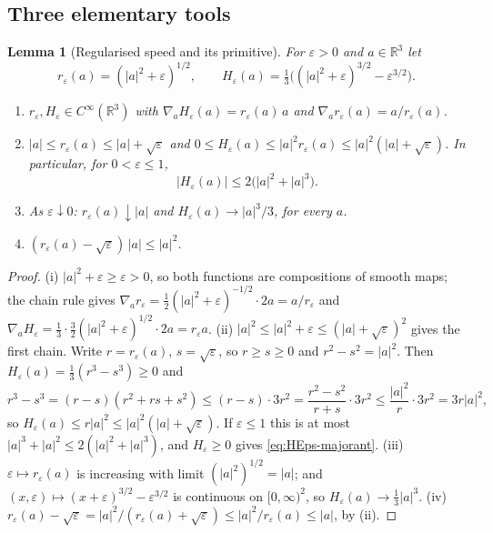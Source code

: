 \documentclass[11pt]{article}
\newtheorem{lemma}[theorem]{Lemma}
\theoremstyle{definition}
\theoremstyle{plain}
\newcommand{\R}{\mathbb R}
\begin{document}
\subsection*{Three elementary tools}

\begin{lemma}[Regularised speed and its primitive]\label{lem:reg-calculus}
For $\varepsilon>0$ and $a\in\R^3$ let
\[
 r_\varepsilon(a)=(|a|^2+\varepsilon)^{1/2},\qquad
 H_\varepsilon(a)=\tfrac13\bigl((|a|^2+\varepsilon)^{3/2}-\varepsilon^{3/2}\bigr).
\]
\begin{enumerate}
\item[(i)] $r_\varepsilon,H_\varepsilon\in C^\infty(\R^3)$ with
 $\nabla_aH_\varepsilon(a)=r_\varepsilon(a)\,a$ and
 $\nabla_ar_\varepsilon(a)=a/r_\varepsilon(a)$.
\item[(ii)] $|a|\leq r_\varepsilon(a)\leq|a|+\sqrt\varepsilon$ and
 $0\leq H_\varepsilon(a)\leq|a|^2r_\varepsilon(a)\leq|a|^2(|a|+\sqrt\varepsilon)$.
 In particular, for $0<\varepsilon\leq1$,
 \begin{equation}\label{eq:HEps-majorant}
  |H_\varepsilon(a)|\leq 2\bigl(|a|^2+|a|^3\bigr).
 \end{equation}
\item[(iii)] As $\varepsilon\downarrow0$: $r_\varepsilon(a)\downarrow|a|$ and
 $H_\varepsilon(a)\to|a|^3/3$, for every $a$.
\item[(iv)] $(r_\varepsilon(a)-\sqrt\varepsilon)\,|a|\leq|a|^2$.
\end{enumerate}
\end{lemma}

\begin{proof}
(i) $|a|^2+\varepsilon\geq\varepsilon>0$, so both functions are compositions
of smooth maps; the chain rule gives
$\nabla_ar_\varepsilon=\tfrac12(|a|^2+\varepsilon)^{-1/2}\cdot2a=a/r_\varepsilon$
and $\nabla_aH_\varepsilon=\tfrac13\cdot\tfrac32(|a|^2+\varepsilon)^{1/2}\cdot2a
=r_\varepsilon a$.
(ii) $|a|^2\leq|a|^2+\varepsilon\leq(|a|+\sqrt\varepsilon)^2$ gives the first
chain.  Write $r=r_\varepsilon(a)$, $s=\sqrt\varepsilon$, so $r\geq s\geq0$ and
$r^2-s^2=|a|^2$.  Then $H_\varepsilon(a)=\tfrac13(r^3-s^3)\geq0$ and
\[
 r^3-s^3=(r-s)(r^2+rs+s^2)\leq(r-s)\cdot3r^2
 =\frac{r^2-s^2}{r+s}\cdot3r^2\leq\frac{|a|^2}{r}\cdot3r^2=3r|a|^2,
\]
so $H_\varepsilon(a)\leq r|a|^2\leq|a|^2(|a|+\sqrt\varepsilon)$.  If
$\varepsilon\leq1$ this is at most $|a|^3+|a|^2\leq2(|a|^2+|a|^3)$, and
$H_\varepsilon\geq0$ gives \eqref{eq:HEps-majorant}.
(iii) $\varepsilon\mapsto r_\varepsilon(a)$ is increasing with limit
$(|a|^2)^{1/2}=|a|$; and $(x,\varepsilon)\mapsto(x+\varepsilon)^{3/2}-\varepsilon^{3/2}$
is continuous on $[0,\infty)^2$, so $H_\varepsilon(a)\to\tfrac13|a|^3$.
(iv) $r_\varepsilon(a)-\sqrt\varepsilon=|a|^2/(r_\varepsilon(a)+\sqrt\varepsilon)
\leq|a|^2/r_\varepsilon(a)\leq|a|$, by (ii).
\end{proof}
\end{document}
